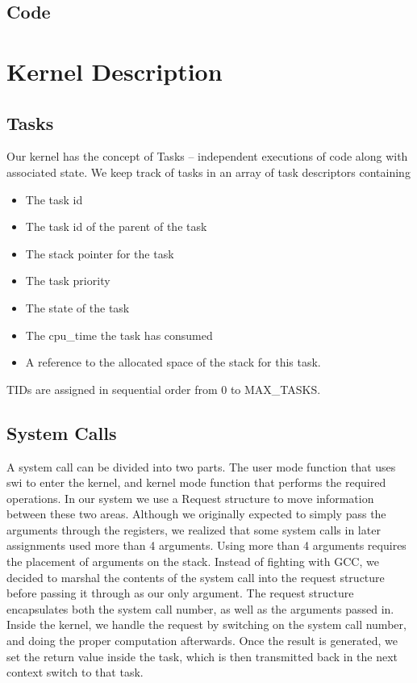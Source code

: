 \documentclass{article}
\begin{document}
\subsection{Code}

\section{Kernel Description}

\subsection{Tasks}

Our kernel has the concept of Tasks -- independent executions of code along with associated state. We keep track of tasks in an array of task descriptors containing

\begin{itemize}
  \item The task id
  \item The task id of the parent of the task
  \item The stack pointer for the task
  \item The task priority
  \item The state of the task
  \item The cpu\_time the task has consumed
  \item A reference to the allocated space of the stack for this task.
\end{itemize}

TIDs are assigned in sequential order from 0 to MAX_TASKS.

\subsection{System Calls}

A system call can be divided into two parts. The user mode function that uses swi to enter the kernel, and kernel mode function that performs the required operations. In our system we use a Request structure to move information between these two areas. Although we originally expected to simply pass the arguments through the registers, we realized that some system calls in later assignments used more than 4 arguments. Using more than 4 arguments requires the placement of arguments on the stack. Instead of fighting with GCC, we decided to marshal the contents of the system call into the request structure before passing it through as our only argument. The request structure encapsulates both the system call number, as well as the arguments passed in. Inside the kernel, we handle the request by switching on the system call number, and doing the proper computation afterwards. Once the result is generated, we set the return value inside the task, which is then transmitted back in the next context switch to that task.
\end{document}

